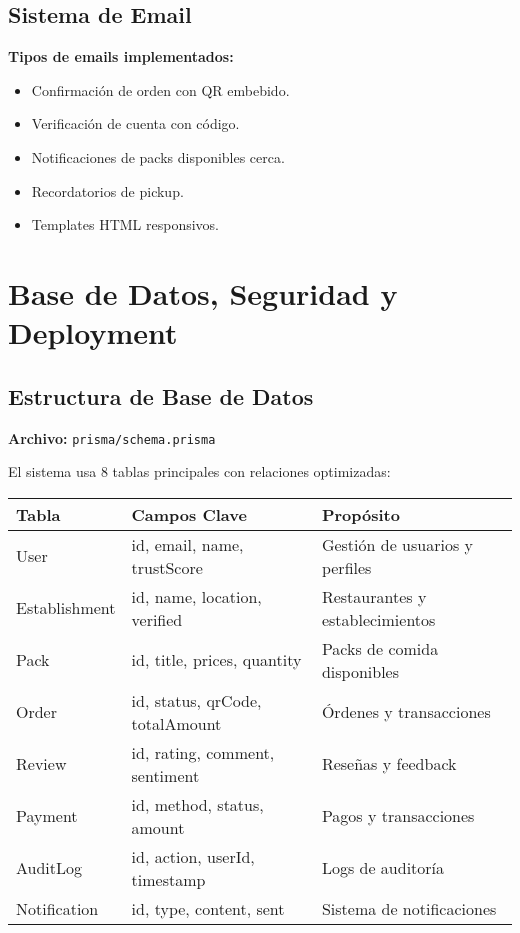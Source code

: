 \documentclass[a4paper,12pt]{article}
\begin{document}
\subsection{Sistema de Email}
\textbf{Tipos de emails implementados:}
\begin{itemize}
  \item Confirmación de orden con QR embebido.
  \item Verificación de cuenta con código.
  \item Notificaciones de packs disponibles cerca.
  \item Recordatorios de pickup.
  \item Templates HTML responsivos.
\end{itemize}

\section{Base de Datos, Seguridad y Deployment}

\subsection{Estructura de Base de Datos}
\textbf{Archivo:} \texttt{prisma/schema.prisma}

El sistema usa 8 tablas principales con relaciones optimizadas:

\begin{longtable}{|p{3cm}|p{4cm}|p{6cm}|}
\hline
\textbf{Tabla} & \textbf{Campos Clave} & \textbf{Propósito} \\
\hline
User & id, email, name, trustScore & Gestión de usuarios y perfiles \\
\hline
Establishment & id, name, location, verified & Restaurantes y establecimientos \\
\hline
Pack & id, title, prices, quantity & Packs de comida disponibles \\
\hline
Order & id, status, qrCode, totalAmount & Órdenes y transacciones \\
\hline
Review & id, rating, comment, sentiment & Reseñas y feedback \\
\hline
Payment & id, method, status, amount & Pagos y transacciones \\
\hline
AuditLog & id, action, userId, timestamp & Logs de auditoría \\
\hline
Notification & id, type, content, sent & Sistema de notificaciones \\
\hline
\end{longtable}
\end{document}
